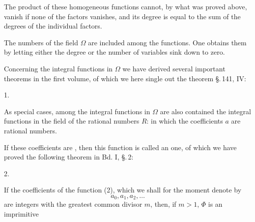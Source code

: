 
The product of these homogeneous functions cannot, by what was proved above, vanish if none of the factors vanishes, and its degree is equal to the sum of the degrees of the individual factors.

The numbers of the field $\Omega$ are included among the functions. One obtains them by letting either the degree or the number of variables sink down to zero.

Concerning the integral functions in $\Omega$ we have derived several important theorems in the first volume, of which we here single out the theorem \S.\,141, IV:

1. 

As special cases, among the integral functions in $\Omega$ are also contained the integral functions in the field of the rational numbers $R$:
in which the coefficients $a$ are rational numbers.

If these coefficients are , then this function is called an  one, of which we have proved the following theorem in Bd. I, \S.\,2:

2. 

If the coefficients of the function (2), which we shall for the moment denote by
\[ a_0, a_1, a_2, \ldots \]
are integers with the greatest common divisor $m$, then, if $m>1$, $\Phi$ is an imprimitive 
